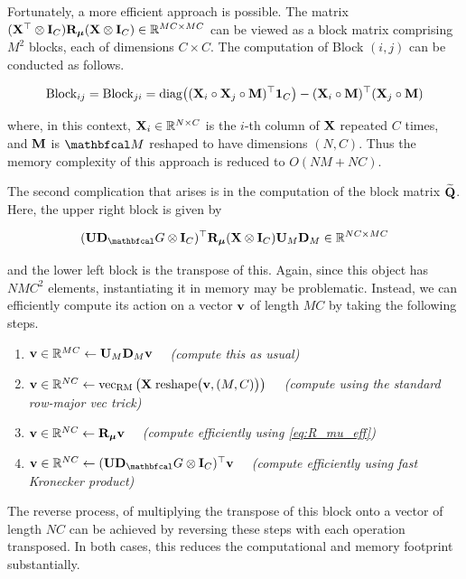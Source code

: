 Fortunately, a more efficient approach is possible. The matrix $(\mathbf{X}^\top \otimes \mathbf{I}_C) \mathbf{R}_{\boldsymbol{\mu}} (\mathbf{X} \otimes \mathbf{I}_C) \in \mathbb{R}^{MC \times MC}$ can be viewed as a block matrix comprising $M^2$ blocks, each of dimensions $C \times C$. The computation of Block $(i, j)$ can be conducted as follows.

\begin{equation*}
    \text{Block}_{ij} = \text{Block}_{ji} = \text{\textup{diag}}\big((\mathbf{X}_i \circ \mathbf{X}_j \circ \mathbf{M})^\top \mathbf{1}_C \big) - (\mathbf{X}_{i} \circ \mathbf{M})^\top  (\mathbf{X}_{j} \circ \mathbf{M})
\end{equation*}

where, in this context, $\mathbf{X}_{i} \in \mathbb{R}^{N \times C}$ is the $i$-th column of $\mathbf{X}$ repeated $C$ times, and $\mathbf{M}$ is $\Mt$ reshaped to have dimensions $(N, C)$. Thus the memory complexity of this approach is reduced to $O(NM + NC)$.  

The second complication that arises is in the computation of the block matrix $\widetilde{\mathbf{Q}}$. Here, the upper right block is given by 

\begin{equation*}
    (\U \D_\Gt \otimes \I_C)^\top \RR_{\muu} (\X \otimes \I_C) \U_M \D_M \in \R^{NC \times MC}
\end{equation*}

and the lower left block is the transpose of this. Again, since this object has $NMC^2$ elements, instantiating it in memory may be problematic. Instead, we can efficiently compute its action on a vector $\mathbf{v}$ of length $MC$ by taking the following steps.

\begin{enumerate}
    \item $\mathbf{v} \in \mathbb{R}^{MC} \leftarrow \mathbf{U}_M \mathbf{D}_M \mathbf{v} \quad$ \textit{(compute this as usual)}
    \item $\mathbf{v} \in \mathbb{R}^{NC} \leftarrow \text{\textup{vec}}_{\text{\textup{RM}}}\left(\mathbf{X} \; \text{reshape}\big(\mathbf{v}, (M, C)\big)\right) \quad $ \textit{(compute using the standard row-major vec trick)}
    \item $\mathbf{v} \in \mathbb{R}^{NC} \leftarrow \mathbf{R}_{\boldsymbol{\mu}} \mathbf{v} \quad$ \textit{(compute efficiently using  \cref{eq:R_mu_eff})}
    \item $\ve \in \R^{NC} \leftarrow (\U \D_\Gt \otimes \I_C)^\top \ve \quad$ \textit{(compute efficiently using fast Kronecker product)}
\end{enumerate}

The reverse process, of multiplying the transpose of this block onto a vector of length $NC$ can be achieved by reversing these steps with each operation transposed. In both cases, this reduces the computational and memory footprint substantially.  


